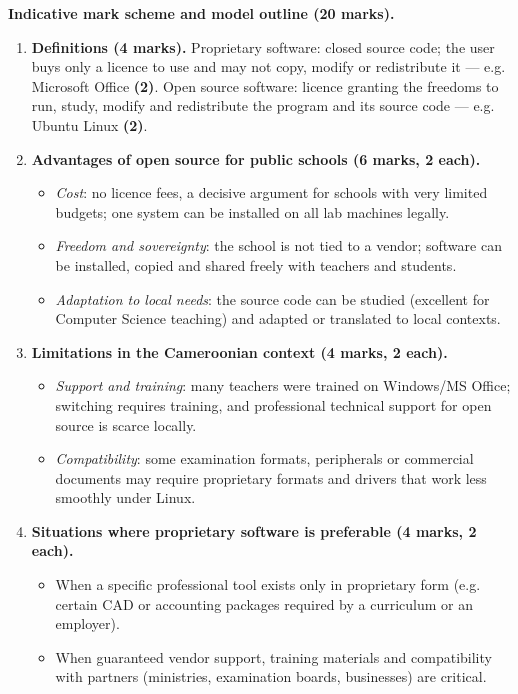 \documentclass[11pt]{article}
\begin{document}
\begin{corrige}
\textbf{Indicative mark scheme and model outline (20 marks).}
\begin{enumerate}
\item \textbf{Definitions (4 marks).} Proprietary software: closed source code; the user buys only a licence to use and may not copy, modify or redistribute it — e.g. Microsoft Office \textbf{(2)}. Open source software: licence granting the freedoms to run, study, modify and redistribute the program and its source code — e.g. Ubuntu Linux \textbf{(2)}.
\item \textbf{Advantages of open source for public schools (6 marks, 2 each).}
\begin{itemize}
\item \emph{Cost}: no licence fees, a decisive argument for schools with very limited budgets; one system can be installed on all lab machines legally.
\item \emph{Freedom and sovereignty}: the school is not tied to a vendor; software can be installed, copied and shared freely with teachers and students.
\item \emph{Adaptation to local needs}: the source code can be studied (excellent for Computer Science teaching) and adapted or translated to local contexts.
\end{itemize}
\item \textbf{Limitations in the Cameroonian context (4 marks, 2 each).}
\begin{itemize}
\item \emph{Support and training}: many teachers were trained on Windows/MS Office; switching requires training, and professional technical support for open source is scarce locally.
\item \emph{Compatibility}: some examination formats, peripherals or commercial documents may require proprietary formats and drivers that work less smoothly under Linux.
\end{itemize}
\item \textbf{Situations where proprietary software is preferable (4 marks, 2 each).}
\begin{itemize}
\item When a specific professional tool exists only in proprietary form (e.g. certain CAD or accounting packages required by a curriculum or an employer).
\item When guaranteed vendor support, training materials and compatibility with partners (ministries, examination boards, businesses) are critical.

\end{itemize}
\end{enumerate}
\end{corrige}
\end{document}
